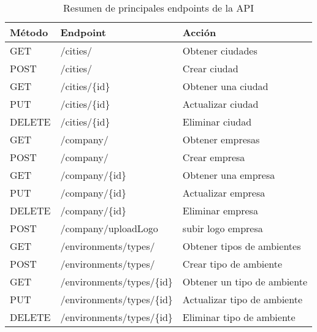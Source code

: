 \begin{table}[H]
    \centering
    \caption[Resumen de principales endpoints de la API]{Resumen de principales endpoints de la API}
    \begin{tabular}{l l l}
        \toprule
        \textbf{Método} & \textbf{Endpoint}                & \textbf{Acción}              \\
        \midrule
        GET             & /cities/                         & Obtener ciudades             \\
        POST            & /cities/                         & Crear ciudad                 \\
        GET             & /cities/\{id\}                   & Obtener una ciudad           \\
        PUT             & /cities/\{id\}                   & Actualizar ciudad            \\
        DELETE          & /cities/\{id\}                   & Eliminar ciudad              \\
        \midrule
        GET             & /company/                        & Obtener empresas             \\
        POST            & /company/                        & Crear empresa                \\
        GET             & /company/\{id\}                  & Obtener una empresa          \\
        PUT             & /company/\{id\}                  & Actualizar empresa           \\
        DELETE          & /company/\{id\}                  & Eliminar empresa             \\
        POST            & /company/uploadLogo              & subir logo empresa           \\
        \midrule
        GET             & /environments/types/             & Obtener tipos de ambientes   \\
        POST            & /environments/types/             & Crear tipo de ambiente       \\
        GET             & /environments/types/\{id\}       & Obtener un tipo de ambiente  \\
        PUT             & /environments/types/\{id\}       & Actualizar tipo de ambiente  \\
        DELETE          & /environments/types/\{id\}       & Eliminar tipo de ambiente    \\

\end{tabular}
\end{table}
